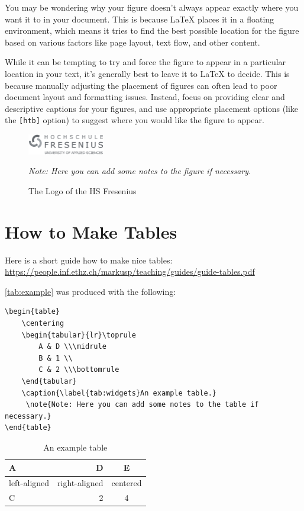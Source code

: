 \documentclass[12pt,final,a4paper,oneside]{book}
\newcommand{\note}[1]{\footnotesize \begin{center} \textsl{#1}\end{center}} %
\begin{document}
You may be wondering why your figure doesn't always appear exactly where you want it to in your document. This is because \LaTeX{} places it in a floating environment, which means it tries to find the best possible location for the figure based on various factors like page layout, text flow, and other content.
	
While it can be tempting to try and force the figure to appear in a particular location in your text, it's generally best to leave it to \LaTeX{} to decide. This is because manually adjusting the placement of figures can often lead to poor document layout and formatting issues. Instead, focus on providing clear and descriptive captions for your figures, and use appropriate placement options (like the \texttt{[htb]} option) to suggest where you would like the figure to appear.
	
\begin{figure}
	\centering
	\includegraphics[width=0.3\textwidth]{hslogo}
	\caption{The Logo of the HS Fresenius}\label{fig:hslogo}
	\note{Note: Here you can add some notes to the figure if necessary.}
\end{figure}
	
\section{How to Make Tables}
	
Here is a short guide how to make nice tables: \url{https://people.inf.ethz.ch/markusp/teaching/guides/guide-tables.pdf}
	
\autoref{tab:example} was produced with the following:
	
	\begin{verbatim}
\begin{table}
	\centering
	\begin{tabular}{lr}\toprule
		A & D \\\midrule
		B & 1 \\
		C & 2 \\\bottomrule
	\end{tabular}
	\caption{\label{tab:widgets}An example table.}
	 \note{Note: Here you can add some notes to the table if necessary.}
\end{table}
\end{verbatim}
	
\begin{table}
	\caption{An example table}\label{tab:example}
	\centering
	\begin{tabular}{lrc}\toprule
		A & D & E \\\midrule
		left-aligned & right-aligned & centered \\
		C & 2 & 4 \\\bottomrule
	\end{tabular}
\end{table}
	
\end{document}
